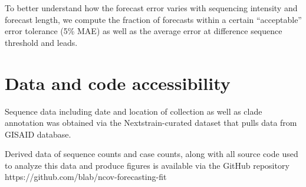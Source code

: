 \documentclass[11pt,oneside,letterpaper]{article}
\begin{document}
To better understand how the forecast error varies with sequencing intensity and forecast length, we compute the fraction of forecasts within a certain ``acceptable'' error tolerance (5\% MAE) as well as the average error at difference sequence threshold and leads.


\section*{Data and code accessibility}

Sequence data including date and location of collection as well as clade annotation was obtained via the Nextstrain-curated
dataset that pulls data from GISAID database. 


Derived data of sequence counts and case counts, along with all source code used to analyze
this data and produce figures is available via the GitHub repository https://github.com/blab/ncov-forecasting-fit




\end{document}
